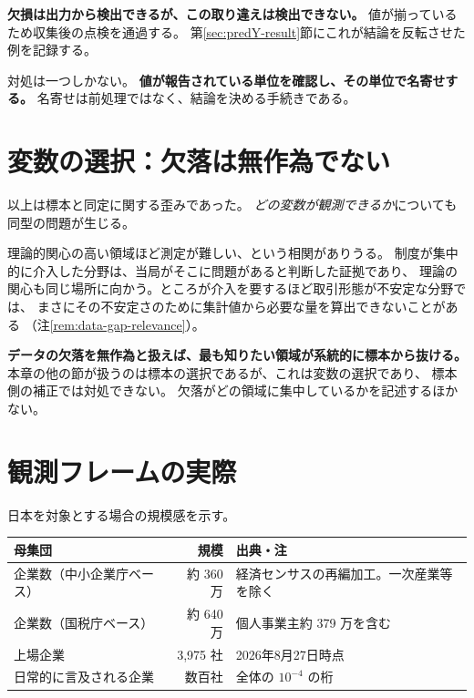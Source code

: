\textbf{欠損は出力から検出できるが、この取り違えは検出できない。}
値が揃っているため収集後の点検を通過する。
第\ref{sec:predY-result}節にこれが結論を反転させた例を記録する。

対処は一つしかない。
\textbf{値が報告されている単位を確認し、その単位で名寄せする。}
名寄せは前処理ではなく、結論を決める手続きである。

\section{変数の選択：欠落は無作為でない}
\label{sec:variable-selection}

以上は標本と同定に関する歪みであった。
\emph{どの変数が観測できるか}についても同型の問題が生じる。

理論的関心の高い領域ほど測定が難しい、という相関がありうる。
制度が集中的に介入した分野は、当局がそこに問題があると判断した証拠であり、
理論の関心も同じ場所に向かう。ところが介入を要するほど取引形態が不安定な分野では、
まさにその不安定さのために集計値から必要な量を算出できないことがある
（注\ref{rem:data-gap-relevance}）。

\textbf{データの欠落を無作為と扱えば、最も知りたい領域が系統的に標本から抜ける。}
本章の他の節が扱うのは標本の選択であるが、これは変数の選択であり、
標本側の補正では対処できない。
欠落がどの領域に集中しているかを記述するほかない。

\section{観測フレームの実際}
\label{sec:frame}

日本を対象とする場合の規模感を示す。

\begin{center}
\begin{tabular}{@{}lrl@{}}
\toprule
母集団 & 規模 & 出典・注 \\
\midrule
企業数（中小企業庁ベース） & 約 360 万 & 経済センサスの再編加工。一次産業等を除く \\
企業数（国税庁ベース） & 約 640 万 & 個人事業主約 379 万を含む \\
上場企業 & 3{,}975 社 & 2026年8月27日時点 \\
日常的に言及される企業 & 数百社 & 全体の $10^{-4}$ の桁 \\
\bottomrule
\end{tabular}
\label{tab:population-frame}
\end{center}

